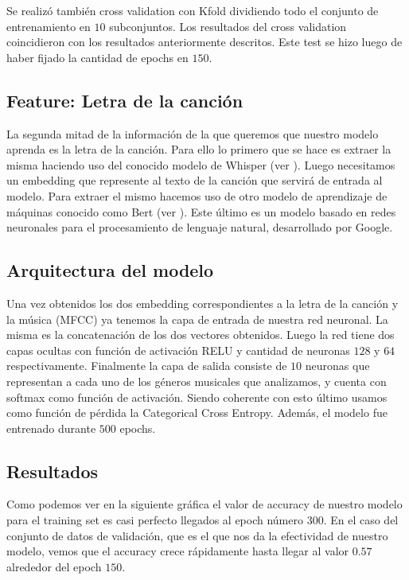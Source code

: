 \documentclass[colorinlistoftodos,twoside,twocolumn,10pt]{article} %
\begin{document}
Se realizó también cross validation con Kfold dividiendo todo el conjunto de entrenamiento en $10$ subconjuntos. Los resultados del cross validation coincidieron con los resultados anteriormente descritos. Este test se hizo luego de haber fijado la cantidad de epochs en $150$.

\subsection{Feature: Letra de la canci\'on}

La segunda mitad de la informaci\'on de la que queremos que nuestro modelo aprenda es la letra de la canci\'on. Para ello lo primero que se hace es extraer la misma haciendo uso del conocido modelo de Whisper (ver \cite{whisper}). Luego necesitamos un embedding que represente al texto de la canci\'on que servir\'a de entrada al modelo. Para extraer el mismo hacemos uso de otro modelo de aprendizaje de m\'aquinas conocido como Bert (ver \cite{bert}). Este \'ultimo es un modelo basado en redes neuronales para el procesamiento de lenguaje natural, desarrollado por Google.

\subsection{Arquitectura del modelo}

Una vez obtenidos los dos embedding correspondientes a la letra de la canci\'on y la m\'usica (MFCC) ya tenemos la capa de entrada de nuestra red neuronal. La misma es la concatenaci\'on de los dos vectores obtenidos. Luego la red tiene  dos capas ocultas con funci\'on de activaci\'on RELU y cantidad de neuronas $128$ y $64$ respectivamente. Finalmente la capa de salida consiste de $10$ neuronas que representan a cada uno de los g\'eneros musicales que analizamos, y cuenta con softmax como funci\'on de activaci\'on. Siendo coherente con esto \'ultimo usamos como funci\'on de p\'erdida la Categorical Cross Entropy. Adem\'as, el modelo fue entrenado durante $500$ epochs.


\subsection{Resultados}

Como podemos ver en la siguiente gr\'afica el valor de accuracy de nuestro modelo para el training set es casi perfecto llegados al epoch n\'umero $300$. En el caso del conjunto de  datos de validaci\'on, que es el que nos da la efectividad de nuestro modelo, vemos que el accuracy crece r\'apidamente hasta llegar al valor $0.57$ alrededor del epoch $150$.
\end{document}

